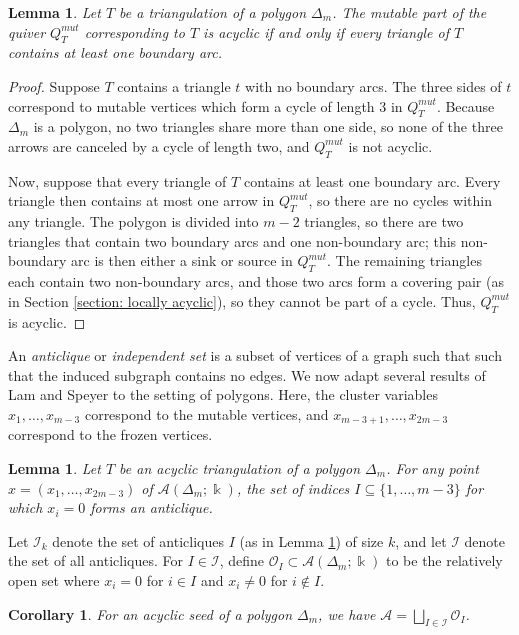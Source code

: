 \documentclass[reqno,12pt]{amsart}
\newtheorem{lemma}[thm]{Lemma}
\newtheorem{corollary}[thm]{Corollary}
\theoremstyle{definition}
\theoremstyle{remark}
\theoremstyle{remark}
\numberwithin{equation}{section}
\begin{document}
\begin{lemma}
	Let $T$ be a triangulation of a polygon $\Delta_m$. The mutable part of the quiver $Q_T^{mut}$ corresponding to $T$ is acyclic if and only if every triangle of $T$ contains at least one boundary arc. 
\end{lemma}
\begin{proof}
	Suppose $T$ contains a triangle $t$ with no boundary arcs. The three sides of $t$ correspond to mutable vertices which form a cycle of length 3 in $Q_T^{mut}$. Because $\Delta_m$ is a polygon, no two triangles share more than one side, so none of the three arrows are canceled by a cycle of length two, and $Q_T^{mut}$ is not acyclic.
	
	Now, suppose that every triangle of $T$ contains at least one boundary arc. Every triangle then contains at most one arrow in $Q_T^{mut}$, so there are no cycles within any triangle. The polygon is divided into $m-2$ triangles, so there are two triangles that contain two boundary arcs and one non-boundary arc; this non-boundary arc is then either a sink or source in $Q_T^{mut}$. The remaining triangles each contain two non-boundary arcs, 
    and those two arcs form a covering pair (as in Section \ref{section: locally acyclic}), so they cannot be part of a cycle. 
    Thus, $Q_T^{mut}$ is acyclic.
\end{proof}


An \emph{anticlique} or \emph{independent set} is a subset of vertices of a graph such that such that the induced subgraph contains no edges. We now adapt several results of Lam and Speyer \cite{LS23} to the setting of polygons. Here, the cluster variables $x_1, \dotsc, x_{m-3}$ correspond to the mutable vertices, and $x_{m-3+1}, \dotsc, x_{2m-3}$ correspond to the frozen vertices.

\begin{lemma}\cite[Lemma 3.1]{LS23}\label{LSlemma31}
	Let $T$ be an acyclic triangulation of a polygon $\Delta_m$. For any point $x = (x_1, \dotsc, x_{2m-3})$ of $\mathcal{A}(\Delta_m; \Bbbk)$, the set of indices $I \subseteq \{1, \dotsc, m-3\}$ for which $x_i =0$ forms an anticlique. 
\end{lemma}

Let $\mathcal{I}_k$ denote the set of anticliques $I$ (as in Lemma \ref{LSlemma31}) of size $k$, and let $\mathcal{I}$ denote the set of all anticliques. For $I \in \mathcal{I}$, define $\mathcal{O}_I \subset \mathcal{A}(\Delta_m; \Bbbk)$ to be the relatively open set where $x_i =0$ for $i \in I$ and  $x_i \neq 0$ for $i \notin I$.
\begin{corollary}\cite[Corollary 3.2]{LS23}
	For an acyclic seed of a polygon $\Delta_m$, we have $\mathcal{A} = \bigsqcup_{I\in \mathcal{I}} \mathcal{O}_I$.
\end{corollary}
\end{document}
